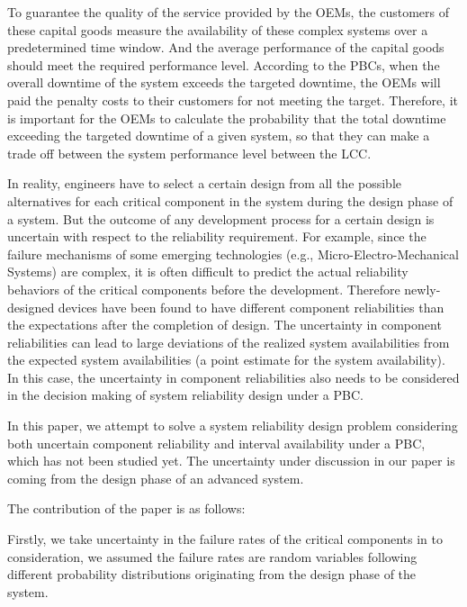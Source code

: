 \documentclass[preprint,12pt]{elsarticle}
\begin{document}

To guarantee the quality of the service provided by the OEMs, the customers of these capital goods measure the availability of these complex systems over a predetermined time window. And the average performance of the capital goods should meet the required performance level. According to the PBCs, when the overall downtime of the system exceeds the targeted downtime, the OEMs will paid the penalty costs to their customers for not meeting the target. Therefore, it is important for the OEMs to calculate the probability that the total downtime exceeding the targeted downtime of a given system, so that they can make a trade off between the system performance level between the LCC.


In reality, engineers have to select a certain design from all the possible alternatives for each critical component in the system during the design phase of a system. But the outcome of any development process for a certain design is uncertain with respect to the reliability requirement. For example, since the failure mechanisms of some emerging technologies (e.g., Micro-Electro-Mechanical Systems) are complex, it is often difficult to predict the actual reliability behaviors of the critical components before the development. Therefore newly-designed devices have been found to have different component reliabilities than the expectations after the completion of design. The uncertainty in component reliabilities can lead to large deviations of the realized system availabilities from the expected system availabilities (a point estimate for the system availability). In this case, the uncertainty in component reliabilities also needs to be considered in the decision making of system reliability design under a PBC.

In this paper, we attempt to solve a system reliability design problem considering both uncertain component reliability and interval availability under a PBC, which has not been studied yet. The uncertainty under discussion in our paper is coming from the design phase of an advanced system.

The contribution of the paper is as follows:

Firstly, we take uncertainty in the failure rates of the critical components in to consideration, we assumed the failure rates are random variables following different probability distributions originating from the design phase of the system.
\end{document}

